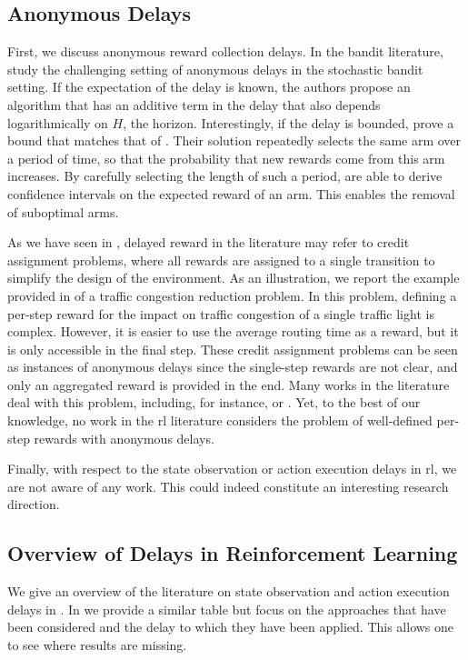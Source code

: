 \subsection{Anonymous Delays}
\label{subsec:anonymous_delay_related}

First, we discuss anonymous reward collection delays.
In the bandit literature, \cite{pike2018bandits} study the challenging setting of anonymous delays in the stochastic bandit setting. 
If the expectation of the delay is known, the authors propose an algorithm that has an additive term in the delay that also depends logarithmically on $H$, the horizon. 
Interestingly, if the delay is bounded, \cite{pike2018bandits} prove a bound that matches that of \cite{joulani2013online}. 
Their solution repeatedly selects the same arm over a period of time, so that the probability that new rewards come from this arm increases. 
By carefully selecting the length of such a period, \cite{pike2018bandits} are able to derive confidence intervals on the expected reward of an arm. 
This enables the removal of suboptimal arms.

As we have seen in , delayed reward in the literature may refer to credit assignment problems, where all rewards are assigned to a single transition to simplify the design of the environment. 
As an illustration, we report the example provided in \cite{gong2019decentralized} of a traffic congestion reduction problem. 
In this problem, defining a per-step reward for the impact on traffic congestion of a single traffic light is complex. 
However, it is easier to use the average routing time as a reward, but it is only accessible in the final step.
These credit assignment problems can be seen as instances of anonymous delays since the single-step rewards are not clear, and only an aggregated reward is provided in the end.
Many works in the literature deal with this problem, including, for instance, \cite{arjona2019rudder} or \cite{han2022off}. 
Yet, to the best of our knowledge, no work in the \gls{rl} literature considers the problem of well-defined per-step rewards with anonymous delays.

Finally, with respect to the state observation or action execution delays in \gls{rl}, we are not aware of any work.
This could indeed constitute an interesting research direction.

\subsection{Overview of Delays in Reinforcement Learning}
We give an overview of the literature on state observation and action execution delays in .
In  we provide a similar table but focus on the approaches that have been considered and the delay to which they have been applied. 
This allows one to see where results are missing.

